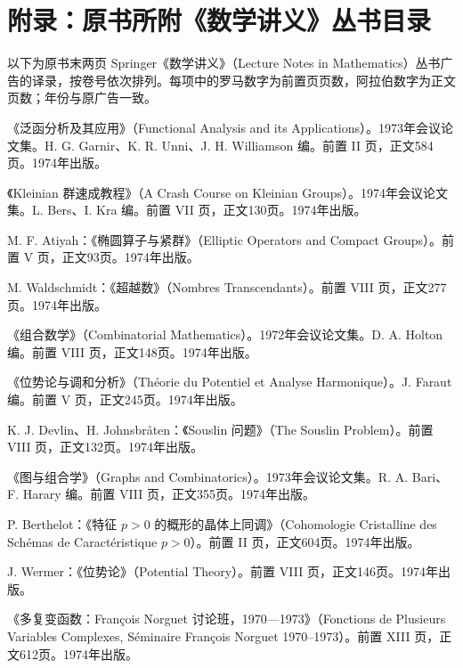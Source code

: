 \chapter*{附录：原书所附《数学讲义》丛书目录}
以下为原书末两页 Springer《数学讲义》（Lecture Notes in Mathematics）丛书广告的译录，按卷号依次排列。每项中的罗马数字为前置页页数，阿拉伯数字为正文页数；年份与原广告一致。
\begingroup\small
\begin{description}[style=nextline,leftmargin=1.5em,itemsep=7pt]
\item[第399卷]《泛函分析及其应用》（Functional Analysis and its Applications）。1973年会议论文集。H. G. Garnir、K. R. Unni、J. H. Williamson 编。前置 II 页，正文584页。1974年出版。
\item[第400卷]《Kleinian 群速成教程》（A Crash Course on Kleinian Groups）。1974年会议论文集。L. Bers、I. Kra 编。前置 VII 页，正文130页。1974年出版。
\item[第401卷] M. F. Atiyah：《椭圆算子与紧群》（Elliptic Operators and Compact Groups）。前置 V 页，正文93页。1974年出版。
\item[第402卷] M. Waldschmidt：《超越数》（Nombres Transcendants）。前置 VIII 页，正文277页。1974年出版。
\item[第403卷]《组合数学》（Combinatorial Mathematics）。1972年会议论文集。D. A. Holton 编。前置 VIII 页，正文148页。1974年出版。
\item[第404卷]《位势论与调和分析》（Théorie du Potentiel et Analyse Harmonique）。J. Faraut 编。前置 V 页，正文245页。1974年出版。
\item[第405卷] K. J. Devlin、H. Johnsbråten：《Souslin 问题》（The Souslin Problem）。前置 VIII 页，正文132页。1974年出版。
\item[第406卷]《图与组合学》（Graphs and Combinatorics）。1973年会议论文集。R. A. Bari、F. Harary 编。前置 VIII 页，正文355页。1974年出版。
\item[第407卷] P. Berthelot：《特征 $p>0$ 的概形的晶体上同调》（Cohomologie Cristalline des Schémas de Caractéristique $p>0$）。前置 II 页，正文604页。1974年出版。
\item[第408卷] J. Wermer：《位势论》（Potential Theory）。前置 VIII 页，正文146页。1974年出版。
\item[第409卷]《多复变函数：François Norguet 讨论班，1970—1973》（Fonctions de Plusieurs Variables Complexes, Séminaire François Norguet 1970--1973）。前置 XIII 页，正文612页。1974年出版。

\end{description}
